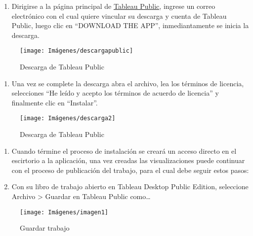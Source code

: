 \documentclass[
]{book}
\providecommand{\tightlist}{%
  \setlength{\itemsep}{0pt}\setlength{\parskip}{0pt}}
\begin{document}
\begin{enumerate}
\def\labelenumi{\arabic{enumi}.}
\tightlist
\item
  Dirigirse a la página principal de \href{https://public.tableau.com/en-us/s/}{Tableau Public}, ingrese un correo electrónico con el cual quiere vincular su descarga y cuenta de Tableau Public, luego clic en ``DOWNLOAD THE APP'', inmediantamente se inicia la descarga.
\end{enumerate}

\begin{figure}

{\centering \texttt{[image: Imágenes/descargapublic]} 

}

\caption{Descarga de Tableau Public}\label{fig:descargapublic-fig}
\end{figure}

\begin{enumerate}
\def\labelenumi{\arabic{enumi}.}
\setcounter{enumi}{1}
\tightlist
\item
  Una vez se complete la descarga abra el archivo, lea los términos de licencia, selecciones ``He leído y acepto los términos de acuerdo de licencia'' y finalmente clic en ``Instalar''.
\end{enumerate}

\begin{figure}

{\centering \texttt{[image: Imágenes/descarga2]} 

}

\caption{Descarga de Tableau Public}\label{fig:descarga2-fig}
\end{figure}

\begin{enumerate}
\def\labelenumi{\arabic{enumi}.}
\setcounter{enumi}{2}
\item
  Cuando términe el proceso de instalación se creará un acceso directo en el escirtorio a la aplicación, una vez creadas las visualizaciones puede continuar con el proceso de publicación del trabajo, para el cual debe seguir estos pasos:
\item
  Con su libro de trabajo abierto en Tableau Desktop Public Edition, seleccione Archivo \textgreater{} Guardar en Tableau Public como\ldots{}
\end{enumerate}

\begin{figure}

{\centering \texttt{[image: Imágenes/imagen1]} 

}

\caption{Guardar trabajo}\label{fig:guardar1-fig}
\end{figure}
\end{document}
